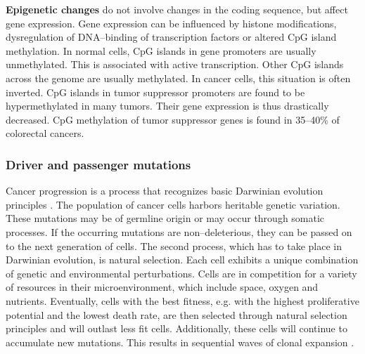     \textbf{Epigenetic changes} do not involve changes in the coding sequence,
    but affect gene expression. Gene expression can be influenced by histone
    modifications, dysregulation of DNA--binding of transcription factors or
    altered CpG island methylation. In normal cells, CpG islands in gene
    promoters are usually unmethylated. This is associated with active
    transcription. Other CpG islands across the genome are usually methylated.
    In cancer cells, this situation is often inverted. CpG islands in tumor
    suppressor promoters are found to be hypermethylated in many tumors. Their
    gene expression is thus drastically decreased. CpG methylation of tumor
    suppressor genes is found in 35--40\%  of colorectal cancers.

    \subsubsection{Driver and passenger mutations}

      Cancer progression is a process that recognizes basic Darwinian evolution
      principles {\cite{clonal_evolution}} {\cite{darwinian_models}}
      {\cite{war_zone}} {\cite{cancer_models}}. The population of cancer cells
      harbors heritable genetic variation. These mutations may be of germline
      origin or may occur through somatic processes. If the occurring mutations
      are non--deleterious, they can be passed on to the next generation of
      cells. The second process, which has to take place in Darwinian evolution,
      is natural selection. Each cell exhibits a unique combination of genetic
      and environmental perturbations. Cells are in competition for a variety of
      resources in their microenvironment, which include space, oxygen and
      nutrients. Eventually, cells with the best fitness, e.g. with the highest
      proliferative potential and the lowest death rate, are then selected
      through natural selection principles and will outlast less fit
      cells. Additionally, these cells will continue to accumulate new
      mutations. This results in sequential waves of clonal expansion
      {\cite{clonal_evolution}}.

